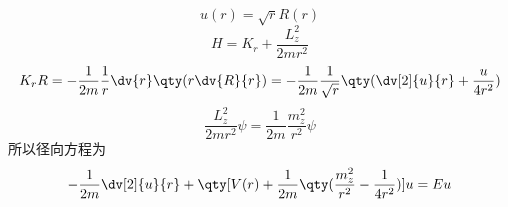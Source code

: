 
\begin{issues}
\issueDraft
\end{issues}


\begin{equation}
u(r) = \sqrt r R(r)
\end{equation}
\begin{equation}
H = K_r + \frac{L_z^2}{2m r^2}
\end{equation}
\begin{equation}
K_r R = -\frac{1}{2m} \frac1r \dv{r} \qty(r \dv{R}{r}) =  - \frac{1}{2m} \frac{1}{\sqrt r} \qty(\dv[2]{u}{r} + \frac{u}{4 r^2})
\end{equation}
\begin{equation}
\frac{L_z^2}{2m r^2}\psi  = \frac{1}{2m} \frac{m_z^2}{r^2}\psi 
\end{equation}
所以径向方程为
\begin{equation}
- \frac{1}{2m} \dv[2]{u}{r} + \qty[V(r) + \frac{1}{2m} \qty(\frac{m_z^2}{r^2} - \frac{1}{4 r^2})]u = Eu
\end{equation}
